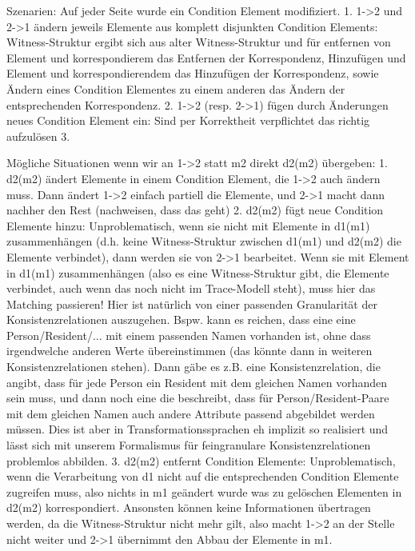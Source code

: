 Szenarien:
Auf jeder Seite wurde ein Condition Element modifiziert.
1. 1->2 und 2->1 ändern jeweils Elemente aus komplett disjunkten Condition Elements: Witness-Struktur ergibt sich aus alter Witness-Struktur und für entfernen von Element und korrespondierem das Entfernen der Korrespondenz, Hinzufügen und Element und korrespondierendem das Hinzufügen der Korrespondenz, sowie Ändern eines Condition Elementes zu einem anderen das Ändern der entsprechenden Korrespondenz.
2. 1->2 (resp. 2->1) fügen durch Änderungen neues Condition Element ein: Sind per Korrektheit verpflichtet das richtig aufzulösen
3. 




Mögliche Situationen wenn wir an 1->2 statt m2 direkt d2(m2) übergeben:
1. d2(m2) ändert Elemente in einem Condition Element, die 1->2 auch ändern muss. Dann ändert 1->2 einfach partiell die Elemente, und 2->1 macht dann nachher den Rest (nachweisen, dass das geht)
2. d2(m2) fügt neue Condition Elemente hinzu: Unproblematisch, wenn sie nicht mit Elemente in d1(m1) zusammenhängen (d.h. keine Witness-Struktur zwischen d1(m1) und d2(m2) die Elemente verbindet), dann werden sie von 2->1 bearbeitet. Wenn sie mit Element in d1(m1) zusammenhängen (also es eine Witness-Struktur gibt, die Elemente verbindet, auch wenn das noch nicht im Trace-Modell steht), muss hier das Matching passieren! Hier ist natürlich von einer passenden Granularität der Konsistenzrelationen auszugehen. Bspw. kann es reichen, dass eine eine Person/Resident/... mit einem passenden Namen vorhanden ist, ohne dass irgendwelche anderen Werte übereinstimmen (das könnte dann in weiteren Konsistenzrelationen stehen). Dann gäbe es z.B. eine Konsistenzrelation, die angibt, dass für jede Person ein Resident mit dem gleichen Namen vorhanden sein muss, und dann noch eine die beschreibt, dass für Person/Resident-Paare mit dem gleichen Namen auch andere Attribute passend abgebildet werden müssen. Dies ist aber in Transformationssprachen eh implizit so realisiert und lässt sich mit unserem Formalismus für feingranulare Konsistenzrelationen problemlos abbilden.
3. d2(m2) entfernt Condition Elemente: Unproblematisch, wenn die Verarbeitung von d1 nicht auf die entsprechenden Condition Elemente zugreifen muss, also nichts in m1 geändert wurde was zu gelöschen Elementen in d2(m2) korrespondiert. Ansonsten können keine Informationen übertragen werden, da die Witness-Struktur nicht mehr gilt, also macht 1->2 an der Stelle nicht weiter und 2->1 übernimmt den Abbau der Elemente in m1.



